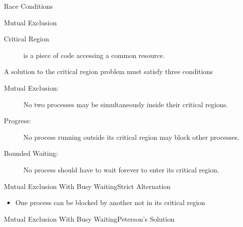 \begin{frame}{Race Conditions}
  \centering
  \mode<beamer>{ \texttt{[image: mos-figs-2-18]} }%
\end{frame}

\begin{frame}{Mutual Exclusion}
  \begin{description}
  \item[Critical Region] is a piece of code accessing a common resource.
  \end{description}
  \begin{center}
  \end{center}
\end{frame}

\begin{frame}
  \begin{block}{A solution to the critical region problem must satisfy three conditions}
    \begin{description}
    \item[Mutual Exclusion:] No two processes may be simultaneously inside their critical
      regions.
    \item[Progress:] No process running outside its critical region may block other
      processes.
    \item[Bounded Waiting:] No process should have to wait forever to enter its critical
      region.
    \end{description}
  \end{block}
\end{frame}

\begin{frame}{Mutual Exclusion With Busy Waiting}{Strict Alternation}
  \begin{center}
  \end{center}
  \begin{itemize}
  \item[\Bad] One process can be blocked by another not in its critical region
  \end{itemize}
\end{frame}

\begin{frame}{Mutual Exclusion With Busy Waiting}{Peterson's Solution}
  \centering
  \begin{refsection}
    \nocite{wiki:peterson}
    \printbibliography[heading=none]
  \end{refsection}
\end{frame}

